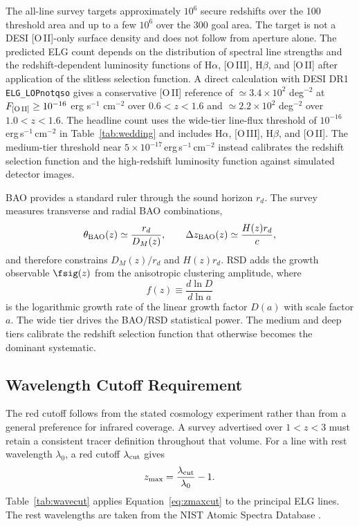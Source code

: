 The all-line survey targets approximately $10^6$ secure redshifts over the 100 \degti threshold area and up to a few $10^6$ over the 300 \degti goal area. The target is not a DESI [O\,II]-only surface density and does not follow from aperture alone. The predicted ELG count depends on the distribution of spectral line strengths and the redshift-dependent luminosity functions of H$\alpha$, [O\,III], H$\beta$, and [O\,II] after application of the slitless selection function. A direct calculation with DESI DR1 \texttt{ELG\_LOPnotqso} gives a conservative [O\,II] reference of $\simeq3.4\times10^2$ deg$^{-2}$ at $F_{\rm [O\,II]}\ge10^{-16}$ erg s$^{-1}$ cm$^{-2}$ over $0.6<z<1.6$ and $\simeq2.2\times10^2$ deg$^{-2}$ over $1.0<z<1.6$. The headline count uses the wide-tier line-flux threshold of $10^{-16}$\,erg\,s$^{-1}$\,cm$^{-2}$ in Table~\ref{tab:wedding} and includes H$\alpha$, [O\,III], H$\beta$, and [O\,II]. The medium-tier threshold near $5\times10^{-17}$\,erg\,s$^{-1}$\,cm$^{-2}$ instead calibrates the redshift selection function and the high-redshift luminosity function against simulated detector images.

BAO provides a standard ruler through the sound horizon $r_d$. The survey measures transverse and radial BAO combinations,
\begin{equation}
  \theta_{\rm BAO}(z)\simeq \frac{r_d}{D_M(z)}, \qquad
  \Delta z_{\rm BAO}(z)\simeq \frac{H(z)r_d}{c},
\end{equation}
and therefore constrains $D_M(z)/r_d$ and $H(z)r_d$. RSD adds the growth observable $\fsig(z)$ from the anisotropic clustering amplitude, where
\begin{equation}
  f(z)\equiv\frac{d\ln D}{d\ln a}
\end{equation}
is the logarithmic growth rate of the linear growth factor $D(a)$ with scale factor $a$. The wide tier drives the BAO/RSD statistical power. The medium and deep tiers calibrate the redshift selection function that otherwise becomes the dominant systematic.

\subsection{Wavelength Cutoff Requirement}\label{sec:wavecut}

The red cutoff follows from the stated cosmology experiment rather than from a general preference for infrared coverage. A survey advertised over $1<z<3$ must retain a consistent tracer definition throughout that volume. For a line with rest wavelength $\lambda_0$, a red cutoff $\lambda_{\rm cut}$ gives
\begin{equation}
  z_{\max}=\frac{\lambda_{\rm cut}}{\lambda_0}-1.
  \label{eq:zmaxcut}
\end{equation}
Table~\ref{tab:wavecut} applies Equation~\eqref{eq:zmaxcut} to the principal ELG lines. The rest wavelengths are taken from the NIST Atomic Spectra Database \cite{nistlines}.

